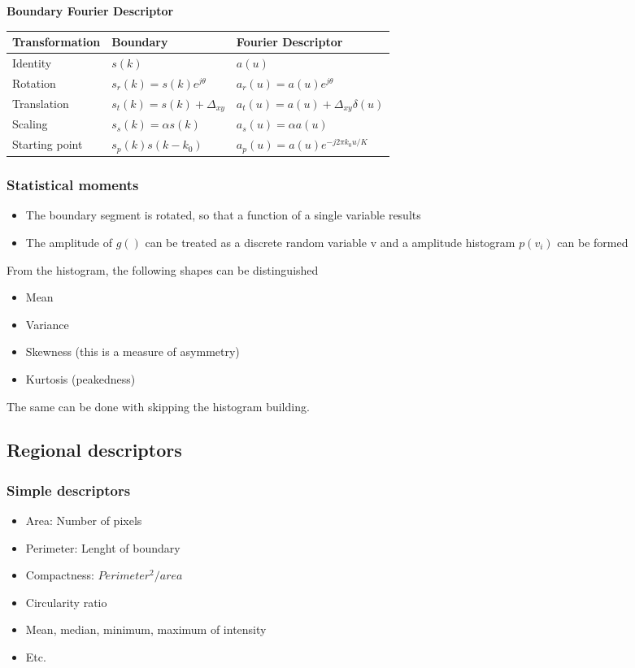 \textbf{Boundary Fourier Descriptor}

\begin{tabularx}{\textwidth}{XXX}
Transformation & Boundary & Fourier Descriptor \\\hline
Identity & $s(k)$ & $a(u)$ \\
Rotation & $s_r(k)=s(k)e^{j\theta}$& $a_r(u)=a(u)e^{j\theta}$ \\
Translation &$s_t(k)=s(k)+\Delta_{xy}$& $a_t(u)=a(u)+\Delta_{xy}\delta(u)$ \\
Scaling &$s_s(k)=\alpha s(k)$& $a_s(u)=\alpha a(u)$ \\
Starting point & $s_p(k)s(k-k_0)$& $a_p(u)=a(u)e^{-j2\pi k_0u/K}$ \\
\end{tabularx}

\subsubsection{Statistical moments}
\begin{itemize}
\item The boundary segment is rotated, so that a function of a single variable results
\item The amplitude of $g()$ can be treated as a discrete random variable v and a amplitude histogram $p(v_i)$ can be formed
\end{itemize}
From the histogram, the following shapes can be distinguished
\begin{itemize}
\item Mean
\item Variance
\item Skewness (this is a measure of asymmetry)
\item Kurtosis (peakedness)
\end{itemize}
The same can be done with skipping the histogram building.

\subsection{Regional descriptors}
\subsubsection{Simple descriptors}
\begin{itemize}
\item Area: Number of pixels
\item Perimeter: Lenght of boundary
\item Compactness: $Perimeter^2/area$
\item Circularity ratio
\item Mean, median, minimum, maximum of intensity
\item Etc.
\end{itemize}
